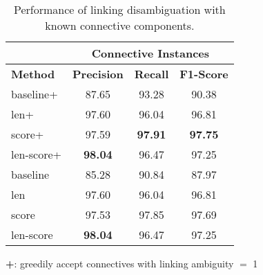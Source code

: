 \begin{table}[ht]
\centering
\begin{tabular}{|l|c|c|c|}
\hline
                            & \multicolumn{3}{c|}{Connective Instances}  \\ \hline
\bf Method                  & \bf Precision & \bf Recall & \bf F1-Score  \\ \hline
    baseline+               &     87.65     &     93.28  &     90.38     \\ \hline
    len+                    &     97.60     &     96.04  &     96.81     \\ \hline
    score+                  &     97.59     & \bf 97.91  & \bf 97.75     \\ \hline
    len-score+              & \bf 98.04     &     96.47  &     97.25     \\


\hhline{|=|=|=|=|}

    baseline                &     85.28     &     90.84  &     87.97     \\ \hline
    len                     &     97.60     &     96.04  &     96.81     \\ \hline
    score                   &     97.53     &     97.85  &     97.69     \\ \hline
    len-score               & \bf 98.04     &     96.47  &     97.25     \\ \hline

\end{tabular}
\begin{flushleft}
\small
\textbf{+}: greedily accept connectives with linking ambiguity $=$ 1
\end{flushleft}
\caption{\label{t:linking-perfect-methods} Performance of linking
disambiguation with known connective components. }
\end{table}

